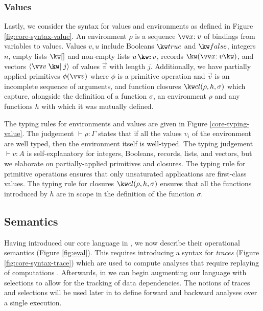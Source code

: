 \subsubsection{Values}
Lastly, we consider the syntax for values and environments as defined in Figure \ref{fig:core-syntax-value}. An environment $\rho$ is a sequence $\vec{\bind{x}{v}}$ of bindings from variables to values. Values $v, u$ include Booleans $\exTrue$ and $\exFalse$, integers $n$, empty lists $\exNil$ and non-empty lists $\exCons{u}{v}$, records $\exRec{\vec{\bind{x}{v}}}$, and vectors $\exVecVal{\vec{v}}{j}$ of values $\vec{v}$ with length $j$. Additionally, we have partially applied primitives $\exPrimOp{\phi}{\vec{v}}$ where $\phi$ is a primitive operation and $\vec{v}$ is an incomplete sequence of arguments, and function closures $\exClosure{\rho}{h}{\sigma}$ which capture, alongside the definition of a function $\sigma$, an environment $\rho$ and any functions $h$ with which it was mutually defined.


\noindent
The typing rules for environments and values are given in Figure \ref{core-typing-value}. The judgement $\vdash \rho: \Gamma$ states that if all the values $v_i$ of the environment are well typed, then the environment itself is well-typed. The typing judgement $\vdash v: A$ is self-explanatory for integers, Booleans, records, lists, and vectors, but we elaborate on partially-applied primitives and closures. The typing rule for primitive operations ensures that only unsaturated applications are first-class values. The typing rule for closures $\exClosure{\rho}{h}{\sigma}$ ensures that all the functions introduced by $h$ are in scope in the definition of the function $\sigma$.



\subsection{Semantics}

Having introduced our core language in , we now describe their operational semantics (Figure \ref{fig:eval}). This requires introducing a syntax for \textit{traces} (Figure \ref{fig:core-syntax-trace}) which are used to compute analyses that require replaying of computations \cite{perera12a}. Afterwards, in  we can begin augmenting our language with selections to allow for the tracking of data dependencies. The notions of traces and selections will be used later in  to define forward and backward analyses over a single execution.


